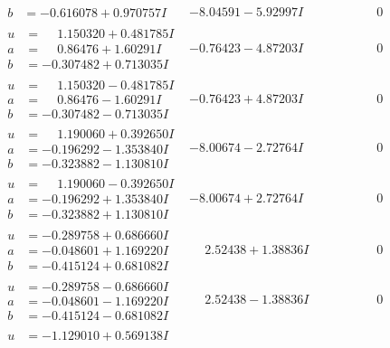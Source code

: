 \documentclass[1p]{elsarticle_modified}
\theoremstyle{definition}
\begin{document}
$$\begin{array}{c|c|c}
\begin{aligned}
b &= -0.616078 + 0.970757 I\end{aligned}
 & -8.04591 - 5.92997 I & \phantom{-0.000000 } 0 \\ \hline\begin{aligned}
u &= \phantom{-}1.150320 + 0.481785 I \\
a &= \phantom{-}0.86476 + 1.60291 I \\
b &= -0.307482 + 0.713035 I\end{aligned}
 & -0.76423 - 4.87203 I & \phantom{-0.000000 } 0 \\ \hline\begin{aligned}
u &= \phantom{-}1.150320 - 0.481785 I \\
a &= \phantom{-}0.86476 - 1.60291 I \\
b &= -0.307482 - 0.713035 I\end{aligned}
 & -0.76423 + 4.87203 I & \phantom{-0.000000 } 0 \\ \hline\begin{aligned}
u &= \phantom{-}1.190060 + 0.392650 I \\
a &= -0.196292 - 1.353840 I \\
b &= -0.323882 - 1.130810 I\end{aligned}
 & -8.00674 - 2.72764 I & \phantom{-0.000000 } 0 \\ \hline\begin{aligned}
u &= \phantom{-}1.190060 - 0.392650 I \\
a &= -0.196292 + 1.353840 I \\
b &= -0.323882 + 1.130810 I\end{aligned}
 & -8.00674 + 2.72764 I & \phantom{-0.000000 } 0 \\ \hline\begin{aligned}
u &= -0.289758 + 0.686660 I \\
a &= -0.048601 + 1.169220 I \\
b &= -0.415124 + 0.681082 I\end{aligned}
 & \phantom{-}2.52438 + 1.38836 I & \phantom{-0.000000 } 0 \\ \hline\begin{aligned}
u &= -0.289758 - 0.686660 I \\
a &= -0.048601 - 1.169220 I \\
b &= -0.415124 - 0.681082 I\end{aligned}
 & \phantom{-}2.52438 - 1.38836 I & \phantom{-0.000000 } 0 \\ \hline\begin{aligned}
u &= -1.129010 + 0.569138 I \\

\end{aligned}
\end{array}$$
\end{document}
